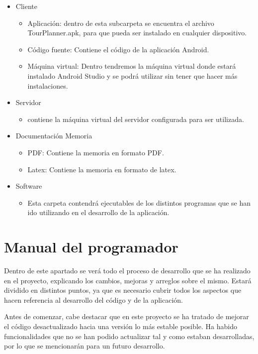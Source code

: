 \begin{itemize}
\item Cliente
 	\begin{itemize}
		\item Aplicación: dentro de esta subcarpeta se encuentra el archivo TourPlanner.apk, para que pueda ser instalado en cualquier dispositivo.
		\item Código fuente: Contiene el código de la aplicación Android.
		\item Máquina virtual: Dentro tendremos la máquina virtual donde estará instalado Android Studio y se podrá utilizar sin tener que hacer más instalaciones.
		\end{itemize}
		
\item Servidor
 	\begin{itemize}
		\item contiene la máquina virtual del servidor configurada para ser utilizada.
		\end{itemize}
		
\item Documentación Memoria
 	\begin{itemize}	
		\item PDF: Contiene la memoria en formato PDF.
		\item Latex: Contiene la memoria en formato de latex.
		\end{itemize}
		
\item Software
 	\begin{itemize}
		\item Esta carpeta contendrá ejecutables de los distintos programas que se han ido utilizando en el desarrollo de la aplicación.
		\end{itemize}		
\end{itemize}

\section{Manual del programador}

Dentro de este apartado se verá todo el proceso de desarrollo que se ha realizado en el proyecto, explicando los cambios, mejoras y arreglos sobre el mismo. Estará dividido en distintos puntos, ya que es necesario cubrir todos los aspectos que hacen referencia al desarrollo del código y de la aplicación.

Antes de comenzar, cabe destacar que en este proyecto se ha tratado de mejorar el código desactualizado hacia una versión lo más estable posible. Ha habido funcionalidades que no se han podido actualizar tal y como estaban desarrolladas, por lo que se mencionarán para un futuro desarrollo.


